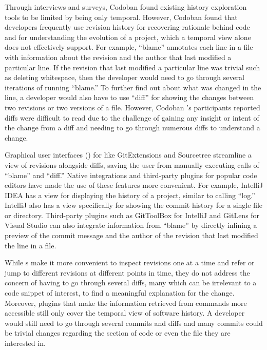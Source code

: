 Through interviews and surveys, Codoban \etal \cite{codoban_software_2015} found existing history exploration tools to be limited by being only temporal. 
However, Codoban \etal found that developers frequently use revision history for recovering rationale behind code and for understanding the evolution of a project, which a temporal view alone does not effectively support. 
For example,  ``blame'' \cite{gitblame} annotates each line in a file with information about the revision and the author that last modified a particular line.
If the revision that last modified a particular line was trivial such as deleting whitespace, then the developer would need to go through several iterations of running ``blame.''
To further find out about what was changed in the line, a developer would also have to use  ``diff'' \cite{gitdiff} for showing the changes between two revisions or two versions of a file.
However, Codoban \etal's participants reported diffs were difficult to read due to the challenge of gaining any insight or intent of the change from a diff and needing to go through numerous diffs to understand a change. \cite{codoban_software_2015}

Graphical user interfaces () for  like GitExtensions \cite{gitextensions} and Sourcetree \cite{sourcetree} streamline a view of revisions alongside diffs, saving the user from manually executing calls of  ``blame'' and ``diff.'' 
Native  integrations and third-party plugins for popular code editors have made the use of these  features more convenient. 
For example, IntelliJ IDEA \cite{intellij} has a view for displaying the  history of a project, similar to calling  ``log.''
IntelliJ also has a view specifically for showing the commit history for a single file or directory. \cite{intellij-showhistory}
Third-party plugins such as GitToolBox for IntelliJ and GitLens for Visual Studio can also integrate information from  ``blame'' by directly inlining a preview of the commit message and the author of the revision that last modified the line in a file.

While s make it more convenient to inspect revisions one at a time and refer or jump to different revisions at different points in time, they do not address the concern of having to go through several diffs, many which can be irrelevant to a code snippet of interest, to find a meaningful explanation for the change.
Moreover, plugins that make the information retrieved from  commands more accessible still only cover the temporal view of software history.
A developer would still need to go through several commits and diffs and many commits could be trivial changes regarding the section of code or even the file they are interested in.

